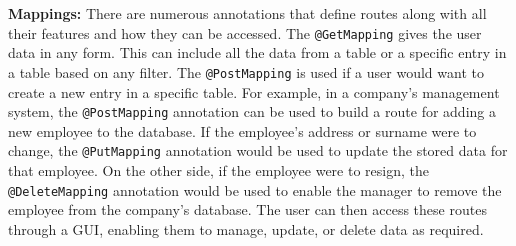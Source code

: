     \textbf{Mappings:} \newline
    There are numerous annotations that define routes along with all their features and how they can be accessed. The \texttt{@GetMapping} gives the user data in any form. This can include all the data from a table or a specific entry in a table based on any filter. The \texttt{@PostMapping} is used if a user would want to create a new entry in a specific table. \newline
    For example, in a company's management system, the \texttt{@PostMapping} annotation can be used to build a route for adding a new employee to the database. If the employee's address or surname were to change, the \texttt{@PutMapping} annotation would be used to update the stored data for that employee. On the other side, if the employee were to resign, the \texttt{@DeleteMapping} annotation would be used to enable the manager to remove the employee from the company's database. \newline
    The user can then access these routes through a GUI, enabling them to manage, update, or delete data as required. \Autocite{Andi:JPA}
    
